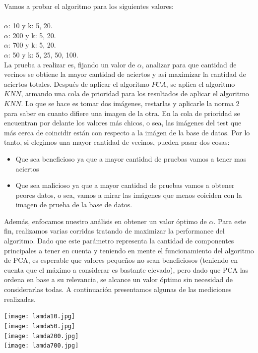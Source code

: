 Vamos a probar el algoritmo para los siguientes valores:\\ \\
$\alpha$: 10  y k: 5, 20.\\
$\alpha$: 200 y k: 5, 20.\\
$\alpha$: 700 y k: 5, 20.\\
$\alpha$: 50  y k: 5, 25, 50, 100.\\

La prueba a realizar es, fijando un valor de $\alpha$, analizar para que cantidad de vecinos se obtiene la mayor cantidad de aciertos y así maximizar la cantidad de aciertos totales.
Después de aplicar el algoritmo $PCA$, se aplica el algoritmo $KNN$, armando una cola de prioridad para los resultados de aplicar el algoritmo $KNN$. Lo que se hace es tomar dos imágenes, restarlas y aplicarle la norma 2 para saber en cuanto difiere una imagen de la otra. En la cola de prioridad se encuentran por delante los valores más chicos, o sea, las imágenes del test que más cerca de coincidir están con respecto a la imágen de la base de datos.
Por lo tanto, si elegimos una mayor cantidad de vecinos, pueden pasar dos cosas:

\begin{itemize}
  \item Que sea beneficioso ya que a mayor cantidad de pruebas vamos a tener mas aciertos
  \item Que sea malicioso ya que a mayor cantidad de pruebas vamos a obtener peores datos, o sea, vamos a mirar las imágenes que menos coiciden con la imagen de prueba de la base de datos.
\end{itemize}

Además, enfocamos nuestro análisis en obtener un valor óptimo de $\alpha$. Para este fin, realizamos varias corridas tratando de maximizar la performance del algoritmo. Dado que este parámetro representa la cantidad de componentes principales a tener en cuenta y teniendo en mente el funcionamiento del algoritmo de PCA, es esperable que valores pequeños no sean beneficiosos (teniendo en cuenta que el máximo a considerar es bastante elevado), pero dado que PCA las ordena en base a su relevancia, se alcance un valor óptimo sin necesidad de considerarlas todas. A continuación presentamos algunas de las mediciones realizadas.

\texttt{[image: lamda10.jpg]}\\
\texttt{[image: lamda50.jpg]}\\
\texttt{[image: lamda200.jpg]}\\
\texttt{[image: lamda700.jpg]}\\

